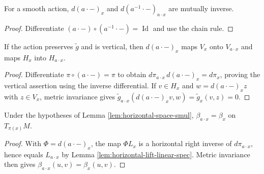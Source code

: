 \begin{lemma}
\label{lem:mfderiv-smul-inv-smul}





For a smooth action, $d(a\cdot {-})_x$ and $d(a^{-1}\cdot {-})_{a\cdot x}$ are mutually inverse.
\end{lemma}

\begin{proof}

\sketch Differentiate $(a\cdot {-})\circ(a^{-1}\cdot {-})=\operatorname{Id}$ and use the chain rule.
\end{proof}

\begin{lemma}
\label{lem:horizontal-space-smul}





If the action preserves $\tilde g$ and is vertical, then $d(a\cdot {-})_x$ maps $V_x$ onto $V_{a\cdot x}$ and maps $H_x$ into $H_{a\cdot x}$.
\end{lemma}

\begin{proof}

\sketch Differentiate $\pi\circ(a\cdot {-})=\pi$ to obtain $d\pi_{a\cdot x}\,d(a\cdot {-})_x=d\pi_x$, proving the vertical assertion using the inverse differential. If $v\in H_x$ and $w=d(a\cdot {-})_xz$ with $z\in V_x$, metric invariance gives $\tilde g_{a\cdot x}(d(a\cdot {-})_xv,w)=\tilde g_x(v,z)=0$.
\end{proof}

\begin{lemma}
\label{lem:submersion-inner-smul}





Under the hypotheses of Lemma \ref{lem:horizontal-space-smul}, $\beta_{a\cdot x}=\beta_x$ on $T_{\pi(x)}M$.
\end{lemma}

\begin{proof}

\sketch With $\Phi=d(a\cdot {-})_x$, the map $\Phi L_x$ is a horizontal right inverse of $d\pi_{a\cdot x}$, hence equals $L_{a\cdot x}$ by Lemma \ref{lem:horizontal-lift-linear-spec}. Metric invariance then gives $\beta_{a\cdot x}(u,v)=\beta_x(u,v)$.
\end{proof}

